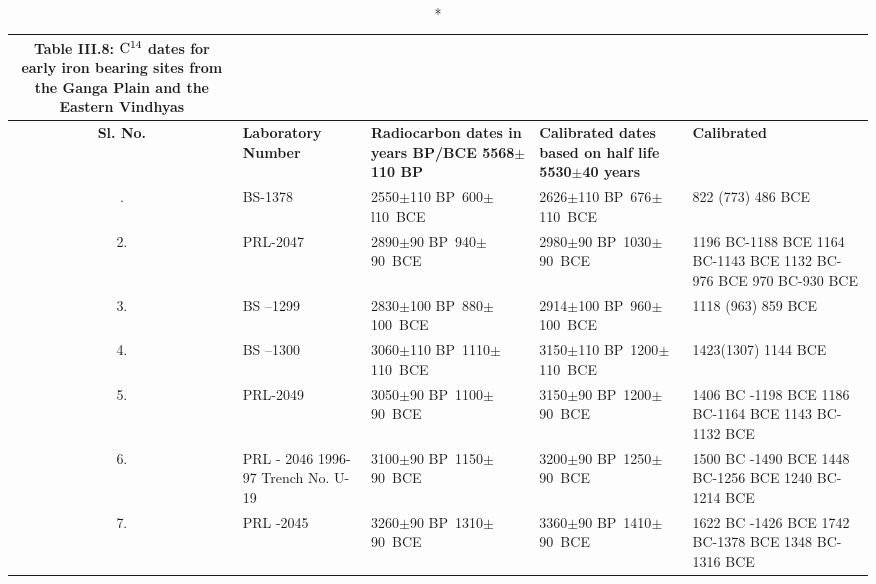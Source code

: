 {\setlength\tabcolsep{2pt}
{\fontsize{8}{10}\selectfont
\begin{longtable}{|c|p{1.6cm}|p{2cm}|p{2cm}|p{2cm}|}
\caption*{Table III.8: ${\rm C}^{14}$ dates for early iron bearing sites from the Ganga Plain and the Eastern Vindhyas} \label{table III.8}\\
\hline
\multicolumn{1}{|m{.5cm}|}{\centering \textbf{Sl. No.}} &
\multicolumn{1}{m{1.6cm}|}{\centering \textbf{Laboratory Number}} &
\multicolumn{1}{m{2cm}|}{\centering \textbf{Radiocarbon dates in years BP/BCE 5568$\pm$110 BP}} & 
\multicolumn{1}{m{2cm}|}{\centering \textbf{Calibrated dates based on half life 5530$\pm$40 years}} & 
\multicolumn{1}{m{2cm}|}{\centering \textbf{Calibrated}}\\
\endfirsthead
\hline
\endhead
\hline
\endfoot
\hline
1. & BS-1378  & 2550$\pm$110 \hbox{BP 600$\pm$l10 BCE} & 2626$\pm$110 \hbox{BP 676$\pm$110 BCE} & 822 (773) 486 BCE\\
2. & PRL-2047  & 2890$\pm$90 \hbox{BP 940$\pm$90 BCE} & 2980$\pm$90 \hbox{BP 1030$\pm$90 BCE} & 1196 BC-1188 BCE 1164 BC-1143 BCE 1132 BC-976 BCE 970 BC-930 BCE \\
3. & BS –1299  & 2830$\pm$100 \hbox{BP 880$\pm$100 BCE} & 2914$\pm$100 \hbox{BP 960$\pm$100 BCE} & 1118 (963) 859 BCE\\
4. & BS –1300  & 3060$\pm$110 \hbox{BP 1110$\pm$110 BCE} & 3150$\pm$110 \hbox{BP 1200$\pm$110 BCE} & 1423(1307) 1144 BCE\\
5. & PRL-2049  & 3050$\pm$90 \hbox{BP 1100$\pm$90 BCE} & 3150$\pm$90 \hbox{BP 1200$\pm$90 BCE} & 1406 BC -1198 BCE 1186 BC-1164 BCE 1143 BC-1132 BCE\\
6. & PRL - 2046 1996-97 Trench No. U-19 & 3100$\pm$90 \hbox{BP 1150$\pm$90 BCE} & 3200$\pm$90 \hbox{BP 1250$\pm$90 BCE} &1500 BC -1490 BCE 1448 BC-1256 BCE 1240 BC-1214 BCE\\
7. & PRL -2045  & 3260$\pm$90 \hbox{BP 1310$\pm$90 BCE} & 3360$\pm$90 \hbox{BP 1410$\pm$90 BCE} & 1622 BC -1426 BCE 1742 BC-1378 BCE 1348 BC-1316 BCE
\end{longtable}
}}

